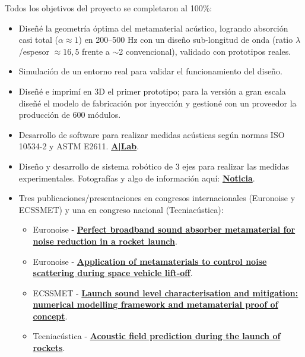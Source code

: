 \documentclass[10pt,a4paper,ragged2e,normalphoto,withhyper]{altacv}
\begin{document}
\begin{minipage}{\linewidth}
\begin{justify}
\noindent Todos los objetivos del proyecto se completaron al 100\%:
\end{justify}
\begin{itemize}
	\vspace{0.25em}
	\item Diseñé la geometría óptima del metamaterial acústico, logrando absorción casi total ($\alpha \approx 1$) en 200--500 Hz con un diseño sub-longitud de onda (ratio $\lambda$/espesor $\approx 16{,}5$ frente a $\sim$2 convencional), validado con prototipos reales.
	\item Simulación de un entorno real para validar el funcionamiento del diseño.
	\item Diseñé e imprimí en 3D el primer prototipo; para la versión a gran escala diseñé el modelo de fabricación por inyección y gestioné con un proveedor la producción de 600 módulos.
	\item Desarrollo de software para realizar medidas acústicas según normas ISO 10534-2 y ASTM E2611. \href{https://github.com/jmrplens/A-Lab}{\bf A|Lab}.
	\item Diseño y desarrollo de sistema robótico de 3 ejes para realizar las medidas experimentales. Fotografías y algo de información aquí: \href{https://cienciagandia.webs.upv.es/2022/03/metamaterial-para-reducir-el-ruido-en-el-lanzamiento-de-cohetes-espaciales/}{\bf Noticia}.
	\item Tres publicaciones/presentaciones en congresos internacionales (Euronoise y ECSSMET) y una en congreso nacional (Tecniacústica):
	\begin{itemize}\setlength\itemsep{0em}
	\item Euronoise - \href{https://jmrp.io/pdf/paper-resources/Conferences/Euronoise/plensEuro2021.pdf}{\bf Perfect broadband sound absorber metamaterial for noise reduction in a rocket launch}.
	\item Euronoise - \href{https://jmrp.io/pdf/paper-resources/Conferences/Euronoise/EscartiEuro2021.pdf}{\bf Application of metamaterials to control noise scattering during space vehicle lift-off}.
	\item ECSSMET - \href{https://www.nojigon.webs.upv.es/pdf/conferences/2021-ECSSMET-Mara-TRP.pdf}{\bf Launch sound level characterisation and mitigation: numerical modelling framework and metamaterial proof of concept}.
	\item Tecniacústica - \href{https://jmrp.io/pdf/paper-resources/Conferences/Tecniacustica/plensTEC2020.pdf}{\bf Acoustic field prediction during the launch of rockets}.
	\end{itemize}
	
\end{itemize}
\end{minipage}
\vspace{0.5em}
\end{document}
